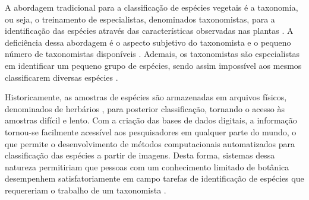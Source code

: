 A abordagem tradicional para a classificação de espécies vegetais é a taxonomia, ou seja, o treinamento de especialistas, denominados taxonomistas, para a identificação das espécies através das características observadas nas plantas \cite{Cope20127562}. A deficiência dessa abordagem é o aspecto subjetivo do taxonomista \cite{JVS:JVS1441} e o pequeno número de taxonomistas disponíveis \cite{Cope20127562}. Ademais, os taxonomistas são especialistas em identificar um pequeno grupo de espécies, sendo assim impossível aos mesmos classificarem diversas espécies \cite{Cope20127562}.

Historicamente, as amostras de espécies são armazenadas em arquivos físicos, denominados de herbários \cite{Cope20127562}, para posterior classificação, tornando o acesso às amostras difícil e lento. Com a criação das bases de dados digitais, a informação tornou-se facilmente acessível aos pesquisadores em qualquer parte do mundo, o que permite o desenvolvimento de métodos computacionais automatizados para classificação das espécies a partir de imagens. Desta forma, sistemas dessa natureza permitiriam que pessoas com um conhecimento limitado de botânica desempenhem satisfatoriamente em campo tarefas de identificação de espécies que requereriam o trabalho de um taxonomista \cite{Cope20127562}.  




 

